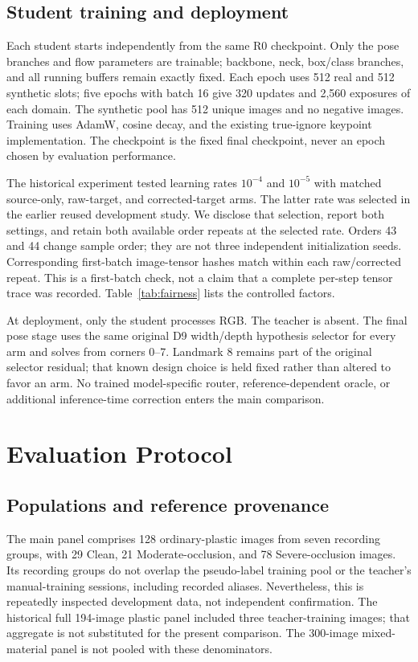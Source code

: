 \documentclass[journal]{IEEEtran}
\begin{document}
\subsection{Student training and deployment}
Each student starts independently from the same R0 checkpoint. Only the pose branches and flow parameters are trainable; backbone, neck, box/class branches, and all running buffers remain exactly fixed. Each epoch uses 512 real and 512 synthetic slots; five epochs with batch 16 give 320 updates and 2,560 exposures of each domain. The synthetic pool has 512 unique images and no negative images. Training uses AdamW, cosine decay, and the existing true-ignore keypoint implementation. The checkpoint is the fixed final checkpoint, never an epoch chosen by evaluation performance.

The historical experiment tested learning rates $10^{-4}$ and $10^{-5}$ with matched source-only, raw-target, and corrected-target arms. The latter rate was selected in the earlier reused development study. We disclose that selection, report both settings, and retain both available order repeats at the selected rate. Orders 43 and 44 change sample order; they are not three independent initialization seeds. Corresponding first-batch image-tensor hashes match within each raw/corrected repeat. This is a first-batch check, not a claim that a complete per-step tensor trace was recorded. Table~\ref{tab:fairness} lists the controlled factors.

At deployment, only the student processes RGB. The teacher is absent. The final pose stage uses the same original D9 width/depth hypothesis selector for every arm and solves from corners 0--7. Landmark 8 remains part of the original selector residual; that known design choice is held fixed rather than altered to favor an arm. No trained model-specific router, reference-dependent oracle, or additional inference-time correction enters the main comparison.


\section{Evaluation Protocol}
\subsection{Populations and reference provenance}
The main panel comprises 128 ordinary-plastic images from seven recording groups, with 29 Clean, 21 Moderate-occlusion, and 78 Severe-occlusion images. Its recording groups do not overlap the pseudo-label training pool or the teacher's manual-training sessions, including recorded aliases. Nevertheless, this is repeatedly inspected development data, not independent confirmation. The historical full 194-image plastic panel included three teacher-training images; that aggregate is not substituted for the present comparison. The 300-image mixed-material panel is not pooled with these denominators.
\end{document}
